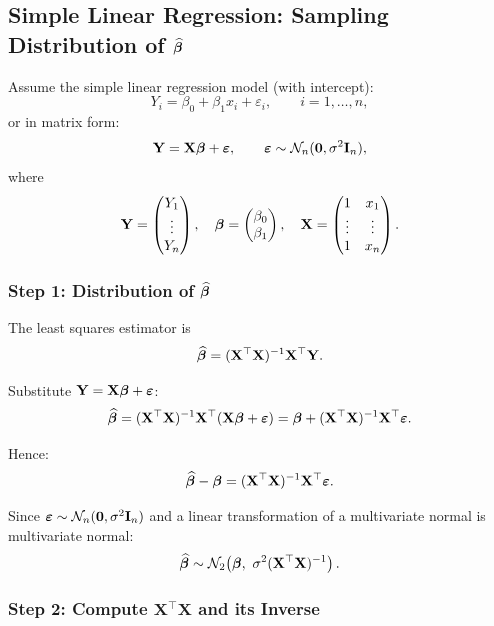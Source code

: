 \subsection{Simple Linear Regression: Sampling Distribution of \texorpdfstring{$\widehat{\boldsymbol{\beta}}$}{beta-hat}}

Assume the simple linear regression model (with intercept):
\[
Y_i = \beta_0 + \beta_1 x_i + \varepsilon_i,
\qquad i=1,\dots,n,
\]
or in matrix form:
\[
\mathbf{Y}=\mathbf{X}\boldsymbol{\beta}+\boldsymbol{\varepsilon},
\qquad
\boldsymbol{\varepsilon}\sim \mathcal{N}_n(\mathbf{0},\sigma^2\mathbf{I}_n),
\]
where
\[
\mathbf{Y}=
\begin{pmatrix}
Y_1\\ \vdots\\ Y_n
\end{pmatrix},
\quad
\boldsymbol{\beta}=
\begin{pmatrix}
\beta_0\\ \beta_1
\end{pmatrix},
\quad
\mathbf{X}=
\begin{pmatrix}
1 & x_1\\
\vdots & \vdots\\
1 & x_n
\end{pmatrix}.
\]

\subsubsection{Step 1: Distribution of \texorpdfstring{$\widehat{\boldsymbol{\beta}}$}{beta-hat}}

The least squares estimator is
\[
\widehat{\boldsymbol{\beta}}
=
(\mathbf{X}^\top \mathbf{X})^{-1}\mathbf{X}^\top \mathbf{Y}.
\]

Substitute $\mathbf{Y}=\mathbf{X}\boldsymbol{\beta}+\boldsymbol{\varepsilon}$:
\[
\widehat{\boldsymbol{\beta}}
=
(\mathbf{X}^\top \mathbf{X})^{-1}\mathbf{X}^\top(\mathbf{X}\boldsymbol{\beta}+\boldsymbol{\varepsilon})
=
\boldsymbol{\beta}+(\mathbf{X}^\top \mathbf{X})^{-1}\mathbf{X}^\top\boldsymbol{\varepsilon}.
\]

Hence:
\[
\widehat{\boldsymbol{\beta}}-\boldsymbol{\beta}
=
(\mathbf{X}^\top \mathbf{X})^{-1}\mathbf{X}^\top\boldsymbol{\varepsilon}.
\]

Since $\boldsymbol{\varepsilon}\sim \mathcal{N}_n(\mathbf{0},\sigma^2\mathbf{I}_n)$ and a linear transformation of a multivariate normal is multivariate normal:
\[
\bhat{\beta} \sim \mathcal{N}_2\!\left(\bbeta,\ \sigma^2(\mathbf{X}^\top\mathbf{X})^{-1}\right).
\]

\subsubsection{Step 2: Compute $\mathbf{X}^\top\mathbf{X}$ and its Inverse}

